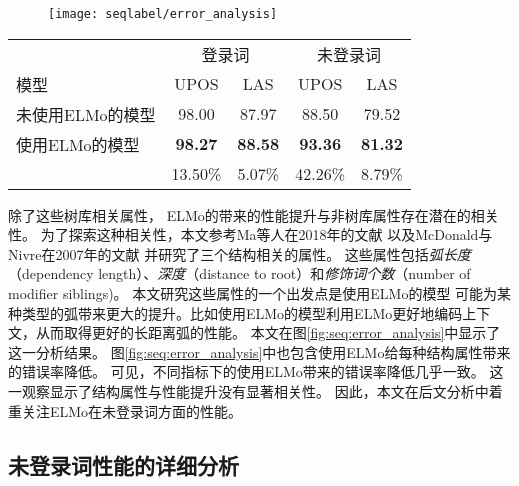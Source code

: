 \begin{figure}[t]
	\centering
	\texttt{[image: seqlabel/error\_analysis]}
\end{figure}

\begin{table}[t]
	\vspace{0.5em}\centering\wuhao
	\begin{tabular}{lcccc}
		\toprule[1.5pt]
		& \multicolumn{2}{c}{登录词} & \multicolumn{2}{c}{未登录词}  \\
		模型 & UPOS & LAS & UPOS & LAS  \\
		\midrule[1pt]
		未使用ELMo的模型 & 98.00 & 87.97 & 88.50 & 79.52 \\
		使用ELMo的模型 & \textbf{98.27} & \textbf{88.58} & \textbf{93.36} & \textbf{81.32} \\
		& 13.50\% & 5.07\%& 42.26\% & 8.79\%\\
		\bottomrule[1.5pt]
	\end{tabular}
\end{table}

除了这些树库相关属性，
ELMo的带来的性能提升与非树库属性存在潜在的相关性。
为了探索这种相关性，本文参考Ma等人在2018年的文献
以及McDonald与Nivre在2007年的文献
并研究了三个结构相关的属性。
这些属性包括\textit{弧长度}（dependency length）、\textit{深度}（distance to root）和\textit{修饰词个数}（number of modifier siblings)。 
本文研究这些属性的一个出发点是使用ELMo的模型
可能为某种类型的弧带来更大的提升。比如使用ELMo的模型利用ELMo更好地编码上下文，从而取得更好的长距离弧的性能。
本文在图\ref{fig:seq:error_analysis}中显示了这一分析结果。
图\ref{fig:seq:error_analysis}中也包含使用ELMo给每种结构属性带来的错误率降低。
可见，不同指标下的使用ELMo带来的错误率降低几乎一致。
这一观察显示了结构属性与性能提升没有显著相关性。
因此，本文在后文分析中着重关注ELMo在未登录词方面的性能。

\subsection{未登录词性能的详细分析}

